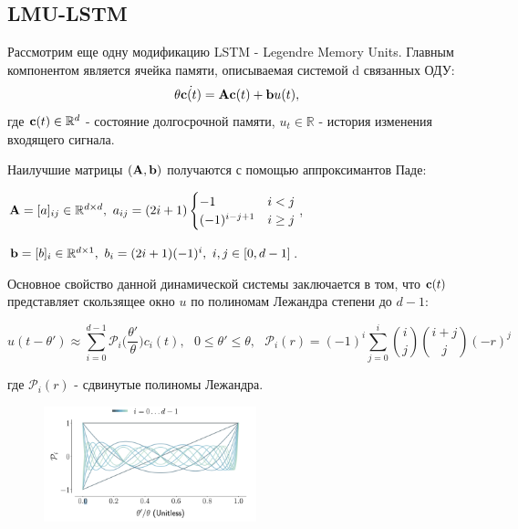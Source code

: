 \subsection{LMU-LSTM}

Рассмотрим еще одну модификацию LSTM - Legendre Memory Units. Главным компонентом является ячейка памяти, описываемая системой d связанных ОДУ:
\begin{equation*}
    \theta \dot{\textbf{c}(t)} = \textbf{A}\textbf{c}(t) + \textbf{b}u(t),
\end{equation*}
где $\textbf{c}(t)\in \mathbb{R}^d$ - состояние долгосрочной памяти,
$u_t \in \mathbb{R}$ - история изменения входящего сигнала.

Наилучшие матрицы $(\textbf{A}, \textbf{b})$ получаются с помощью аппроксимантов Паде:

\begin{center}
    $\textbf{A} = [a]_{ij} \in \mathbb{R}^{d\times d}, \text{ } a_{ij} = (2i+1)
    \begin{cases}
        -1 & i < j \\
        (-1)^{i-j+1} & i\ge j\\
    \end{cases}$,
\end{center}
\begin{center}
    $\textbf{b} = [b]_i \in \mathbb{R}^{d\times 1},  \text{ } b_i = (2i+1)(-1)^i,  \text{ } i, j \in [0, d-1]$.
\end{center}

Основное свойство данной динамической системы заключается в том, что $\textbf{c}(t)$ представляет скользящее окно $u$ по полиномам Лежандра степени до $d-1$:

\begin{equation*}
    u(t-\theta') \approx \sum\limits_{i=0}^{d-1} \mathcal{P}_i\Bigg(\frac{\theta'}{\theta}\Bigg)c_i(t), \text{ } 0\le \theta' \le \theta, \text{ } \mathcal{P}_i(r) = (-1)^i\sum\limits_{j=0}^i\binom{i}{j}\binom{i+j}{j}(-r)^j
\end{equation*}

где $\mathcal{P}_i(r)$ - сдвинутые полиномы Лежандра.
\begin{figure}[!h]
	\centering
	\includegraphics[width=0.55\textwidth]{chapters/varenik1/images/legendre.png}
\end{figure}

